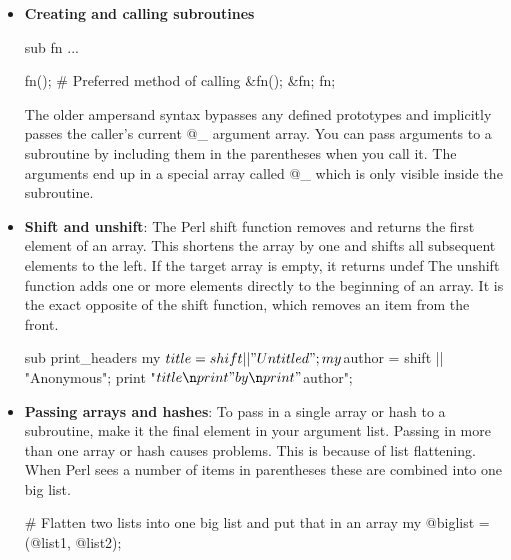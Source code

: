 \documentclass{report}
\begin{document}
    \pagebreak 
    \begin{itemize}
        \item \textbf{Creating and calling subroutines}        
            \bigbreak \noindent 
            \begin{perlcode}
                sub fn {
                    ...
                }

                fn(); # Preferred method of calling
                &fn();
                &fn;
                fn;
            \end{perlcode}
            \bigbreak \noindent 
            The older ampersand syntax bypasses any defined prototypes and implicitly passes the caller's current @\_ argument array.
            \bigbreak \noindent 
            You can pass arguments to a subroutine by including them in the parentheses when you call it. The arguments end up in a special array called @\_ which is only visible inside the subroutine.
        \item \textbf{Shift and unshift}: The Perl shift function removes and returns the first element of an array. This shortens the array by one and shifts all subsequent elements to the left. If the target array is empty, it returns undef
            \bigbreak \noindent 
            The unshift function adds one or more elements directly to the beginning of an array. It is the exact opposite of the shift function, which removes an item from the front.
            \bigbreak \noindent 
            \begin{perlcode}
                sub print_headers {
                    my $title = shift || "Untitled";
                    my $author = shift || "Anonymous";
                    print "$title\n
                    print "by\n
                    print "$author\n";
                }
            \end{perlcode}
        \item \textbf{Passing arrays and hashes}: To pass in a single array or hash to a subroutine, make it the final element in your argument list. 
            \bigbreak \noindent 
            Passing in more than one array or hash causes problems. This is because of list flattening. When Perl sees a number of items in parentheses these are combined into one big list.
            \bigbreak \noindent 
            \begin{perlcode}
                # Flatten two lists into one big list and put that in an array
                my @biglist = (@list1, @list2);


\end{perlcode}
\end{itemize}
\end{document}
